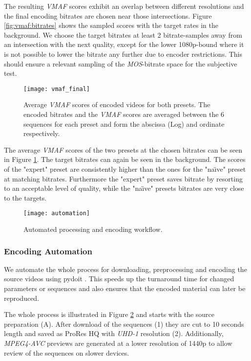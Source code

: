 The resulting \textit{VMAF} scores exhibit an overlap between different resolutions and the final encoding bitrates are chosen near those intersections. Figure \ref{fig:vmaf:bitrates} shows the sampled scores with the target rates in the background. We choose the target bitrates at least 2 bitrate-samples away from an intersection with the next quality, except for the lower 1080p-bound where it is not possible to lower the bitrate any further due to encoder restrictions. This should ensure a relevant sampling of the \textit{MOS}-bitrate space for the subjective test.

\begin{figure}[htb!]
	\centering
	\texttt{[image: vmaf\_final]}
	\caption{Average \textit{VMAF} scores of encoded videos for both presets. The encoded bitrates and the \textit{VMAF} scores are averaged between the 6 sequences for each preset and form the abscissa (Log) and ordinate respectively.}
	\label{fig:vmaf:encoded}
\end{figure}

The average \textit{VMAF} scores of the two presets at the chosen bitrates can be seen in Figure \ref{fig:vmaf:encoded}. The target bitrates can again be seen in the background. The scores of the "expert" preset are consistently higher than the ones for the "na\"{\i}ve" preset at matching bitrates. Furthermore the "expert" preset saves bitrate by resorting to an acceptable level of quality, while the "na\"{\i}ve" presets bitrates are very close to the targets.


\begin{figure}[bht!]
	\centering
	\texttt{[image: automation]}
	\caption{Automated processing and encoding workflow.}
	\label{fig:automation}
\end{figure}

\subsubsection{Encoding Automation}
We automate the whole process for downloading, preprocessing and encoding the source videos using pydoit \cite{web:pydoit}. This speeds up the turnaround time for changed parameters or sequences and also ensures that the encoded material can later be reproduced.

The whole process is illustrated in Figure \ref{fig:automation} and starts with the source preparation (A). After download of the sequences (1) they are cut to 10 seconds length and saved as ProRes HQ with \textit{UHD-1} resolution (2). Additionally, \textit{MPEG4-AVC} previews are generated at a lower resolution of 1440p to allow review of the sequences on slower devices.

